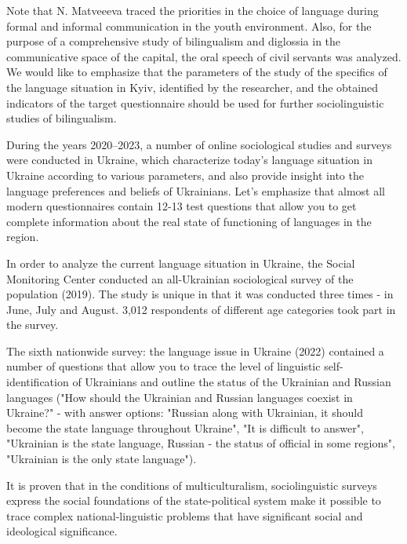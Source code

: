 \documentclass[english]{textolivre}
\begin{document}
Note that N. Matveeeva traced the priorities in the choice of language during formal and informal communication in the youth environment. Also, for the purpose of a comprehensive study of bilingualism and diglossia in the communicative space of the capital, the oral speech of civil servants was analyzed. We would like to emphasize that the parameters of the study of the specifics of the language situation in Kyiv, identified by the researcher, and the obtained indicators of the target questionnaire should be used for further sociolinguistic studies of bilingualism.

During the years 2020–2023, a number of online sociological studies and surveys were conducted in Ukraine, which characterize today's language situation in Ukraine according to various parameters, and also provide insight into the language preferences and beliefs of Ukrainians. Let's emphasize that almost all modern questionnaires contain 12-13 test questions that allow you to get complete information about the real state of functioning of languages in the region.

In order to analyze the current language situation in Ukraine, the Social Monitoring Center conducted an all-Ukrainian sociological survey of the population (2019). The study is unique in that it was conducted three times - in June, July and August. 3,012 respondents of different age categories took part in the survey.

The sixth nationwide survey: the language issue in Ukraine (2022) contained a number of questions that allow you to trace the level of linguistic self-identification of Ukrainians and outline the status of the Ukrainian and Russian languages ("How should the Ukrainian and Russian languages coexist in Ukraine?" - with answer options: "Russian along with Ukrainian, it should become the state language throughout Ukraine", "It is difficult to answer", "Ukrainian is the state language, Russian - the status of official in some regions", "Ukrainian is the only state language").

It is proven that in the conditions of multiculturalism, sociolinguistic surveys express the social foundations of the state-political system make it possible to trace complex national-linguistic problems that have significant social and ideological significance.
\end{document}

